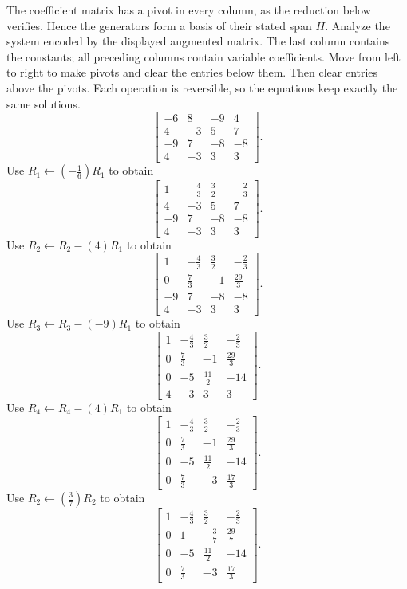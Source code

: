 The coefficient matrix has a pivot in every column, as the reduction below verifies. Hence the generators form a basis of their stated span $H$.
\goal Analyze the system encoded by the displayed augmented matrix. The last column contains the constants; all preceding columns contain variable coefficients.
\idea Move from left to right to make pivots and clear the entries below them. Then clear entries above the pivots. Each operation is reversible, so the equations keep exactly the same solutions.
\[ \left[\begin{array}{rrr|r}-6&8&-9&4\\4&-3&5&7\\-9&7&-8&-8\\4&-3&3&3\end{array}\right].\]
Use $R_{1}\leftarrow(- \frac{1}{6})R_{1}$ to obtain
\[ \left[\begin{array}{rrr|r}1&- \frac{4}{3}&\frac{3}{2}&- \frac{2}{3}\\4&-3&5&7\\-9&7&-8&-8\\4&-3&3&3\end{array}\right].\]
Use $R_{2}\leftarrow R_{2}-(4)R_{1}$ to obtain
\[ \left[\begin{array}{rrr|r}1&- \frac{4}{3}&\frac{3}{2}&- \frac{2}{3}\\0&\frac{7}{3}&-1&\frac{29}{3}\\-9&7&-8&-8\\4&-3&3&3\end{array}\right].\]
Use $R_{3}\leftarrow R_{3}-(-9)R_{1}$ to obtain
\[ \left[\begin{array}{rrr|r}1&- \frac{4}{3}&\frac{3}{2}&- \frac{2}{3}\\0&\frac{7}{3}&-1&\frac{29}{3}\\0&-5&\frac{11}{2}&-14\\4&-3&3&3\end{array}\right].\]
Use $R_{4}\leftarrow R_{4}-(4)R_{1}$ to obtain
\[ \left[\begin{array}{rrr|r}1&- \frac{4}{3}&\frac{3}{2}&- \frac{2}{3}\\0&\frac{7}{3}&-1&\frac{29}{3}\\0&-5&\frac{11}{2}&-14\\0&\frac{7}{3}&-3&\frac{17}{3}\end{array}\right].\]
Use $R_{2}\leftarrow(\frac{3}{7})R_{2}$ to obtain
\[ \left[\begin{array}{rrr|r}1&- \frac{4}{3}&\frac{3}{2}&- \frac{2}{3}\\0&1&- \frac{3}{7}&\frac{29}{7}\\0&-5&\frac{11}{2}&-14\\0&\frac{7}{3}&-3&\frac{17}{3}\end{array}\right].\]
